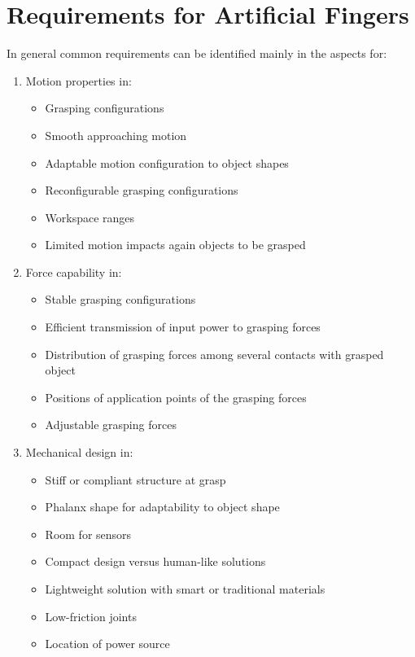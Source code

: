 \documentclass[a4paper, 10pt, conference]{ieeeconf}      %
\begin{document}
\section{\textbf{Requirements for Artificial Fingers}}
In general common requirements can be identified mainly in the aspects for:\\
\begin{enumerate}
  \item Motion properties in:
  	\begin{itemize}
  		\item Grasping configurations
  		\item Smooth approaching motion
		\item Adaptable motion configuration to object shapes
		\item Reconfigurable grasping configurations
		\item Workspace ranges
		\item Limited motion impacts again objects to be grasped
	\end{itemize}
  \item Force capability in:
  	\begin{itemize}
  		\item Stable grasping configurations
		\item Efficient transmission of input power to grasping forces
		\item Distribution of grasping forces among several contacts with grasped object
		\item Positions of application points of the grasping forces
		\item Adjustable grasping forces
  	\end{itemize}
  \item Mechanical design in:
  	\begin{itemize}
  		\item Stiff or compliant structure at grasp
		\item Phalanx shape for adaptability to object shape
		\item Room for sensors
		\item Compact design versus human-like solutions
		\item Lightweight solution with smart or traditional materials
		\item Low-friction joints
		\item Location of power source
  	\end{itemize}
\end{enumerate}
	

\nocite{*}

%
\end{document}
